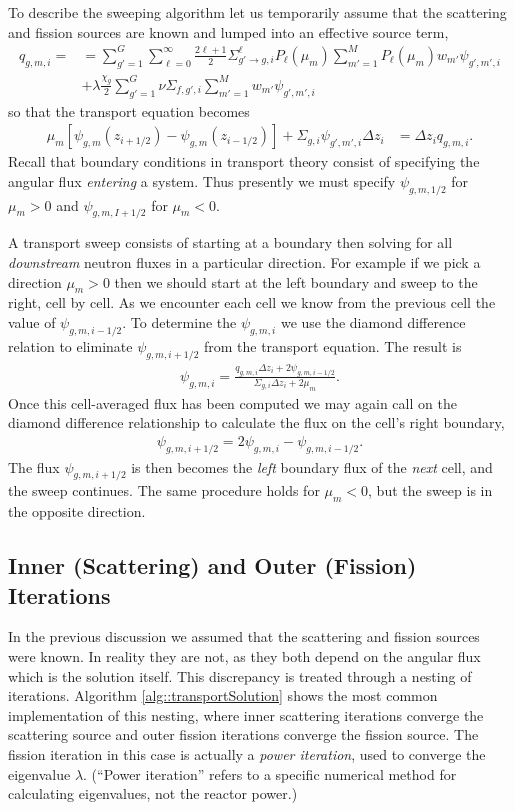 \documentclass[11pt]{article}
\begin{document}
To describe the sweeping algorithm let us temporarily assume that the scattering and fission sources are known and lumped into an effective source term,
\begin{align}
  q_{g,m,i} = &= \sum_{g'=1}^G \sum_{\ell=0}^\infty \frac{2\ell+1}{2} \Sigma_{g' \rightarrow g,i}^\ell P_\ell(\mu_m) \sum_{m'=1}^M P_\ell(\mu_m) w_{m'} \psi_{g',m',i} \\
  &+ \lambda\frac{\chi_g}{2} \sum_{g'=1}^G \nu\Sigma_{f,g',i} \sum_{m'=1}^M w_{m'} \psi_{g',m',i}
\end{align}
so that the transport equation becomes
\begin{align}
  \mu_m \left[ \psi_{g,m}(z_{i+1/2}) - \psi_{g,m}(z_{i-1/2}) \right]
  + \Sigma_{g,i} \psi_{g',m',i} \Delta z_i
  &= \Delta z_i q_{g,m,i}.
\end{align}
Recall that boundary conditions in transport theory consist of specifying the angular flux \emph{entering} a system.  Thus presently we must specify \(\psi_{g,m,1/2}\) for \(\mu_m > 0\) and \(\psi_{g,m,I+1/2}\) for \(\mu_m<0\).

A transport sweep consists of starting at a boundary then solving for all \emph{downstream} neutron fluxes in a particular direction.  For example if we pick a direction \(\mu_m > 0\) then we should start at the left boundary and sweep to the right, cell by cell.  As we encounter each cell we know from the previous cell the value of \(\psi_{g,m,i-1/2}\).  To determine the \(\psi_{g,m,i}\) we use the diamond difference relation to eliminate \(\psi_{g,m,i+1/2}\) from the transport equation.  The result is
\begin{align}
  \psi_{g,m,i} = \frac{q_{g,m,i} \Delta z_i + 2 \psi_{g,m,i-1/2}}{\Sigma_{g,i} \Delta z_i + 2 \mu_m}.
\end{align}
Once this cell-averaged flux has been computed we may again call on the diamond difference relationship to calculate the flux on the cell's right boundary,
\begin{align}
  \psi_{g,m,i+1/2} = 2 \psi_{g,m,i} - \psi_{g,m,i-1/2}.
\end{align}
The flux \(\psi_{g,m,i+1/2}\) is then becomes the \emph{left} boundary flux of the \emph{next} cell, and the sweep continues.  The same procedure holds for \(\mu_m < 0\), but the sweep is in the opposite direction.

\subsection{Inner (Scattering) and Outer (Fission) Iterations}
\label{sec:orgheadline16}
In the previous discussion we assumed that the scattering and fission sources were known.  In reality they are not, as they both depend on the angular flux which is the solution itself.  This discrepancy is treated through a nesting of iterations.  Algorithm \ref{alg::transportSolution} shows the most common implementation of this nesting, where inner scattering iterations converge the scattering source and outer fission iterations converge the fission source.  The fission iteration in this case is actually a \emph{power iteration}, used to converge the eigenvalue \(\lambda\).  (``Power iteration'' refers to a specific numerical method for calculating eigenvalues, not the reactor power.)
\end{document}
